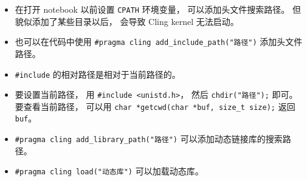 \begin{itemize}
\item 在打开 notebook 以前设置 \verb|CPATH| 环境变量， 可以添加头文件搜索路径。 但貌似添加了某些目录以后， 会导致 Cling kernel 无法启动。
\item 也可以在代码中使用 \verb|#pragma cling add_include_path("路径")| 添加头文件路径。
\item \verb|#include| 的相对路径是相对于当前路径的。
\item 要设置当前路径， 用 \verb|#include <unistd.h>|， 然后 \verb|chdir("路径");| 即可。 要查看当前路径， 可以用 \verb|char *getcwd(char *buf, size_t size);| 返回 \verb|buf|。
\item \verb|#pragma cling add_library_path("路径")| 可以添加动态链接库的搜索路径。
\item \verb|#pragma cling load("动态库")| 可以加载动态库。
\end{itemize}
